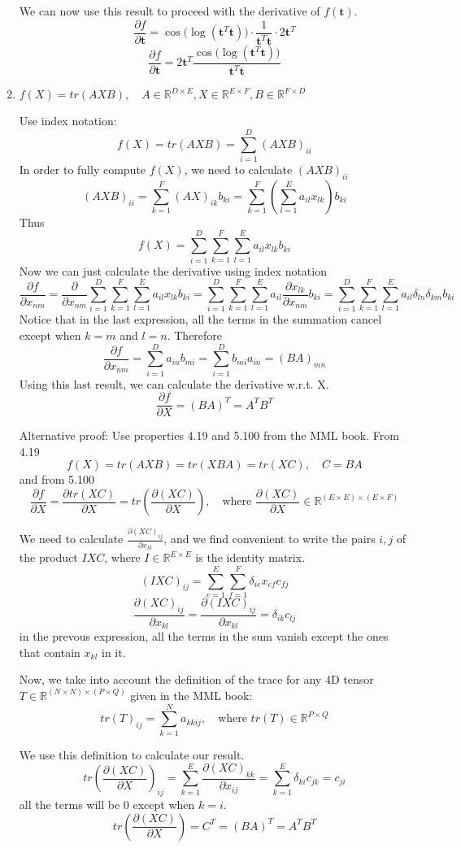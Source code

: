 \begin{enumerate}[label=\alph*]
We can now use this result to proceed with the derivative of $f(\textbf{t})$.
\[
\frac{\partial f}{\partial \textbf{t}} = \cos \big(\log(\textbf{t}^T\textbf{t})\big) \cdot \frac{1}{\textbf{t}^T\textbf{t}} \cdot 2\textbf{t}^T
\]
\[
\frac{\partial f}{\partial \textbf{t}} = 2\textbf{t}^T \frac{\cos\big(\log(\textbf{t}^T\textbf{t})\big)}{\textbf{t}^T\textbf{t}}
\]

\item $f(X) = tr(AXB), \quad A\in \mathbb{R}^{D\times E},
X\in \mathbb{R}^{E\times F},
B\in \mathbb{R}^{F\times D}$

Use index notation:
\[
f(X) = tr(AXB) = \sum_{i=1}^D (AXB)_{ii}
\]
In order to fully compute $f(X)$, we need to calculate $(AXB)_{ii}$
\[
(AXB)_{ii} = \sum_{k=1}^F (AX)_{ik}b_{ki} = \sum_{k=1}^F \left(\sum_{l=1}^E a_{il}x_{lk}\right)b_{ki}
\]
Thus
\[
f(X) = \sum_{i=1}^D\sum_{k=1}^F \sum_{l=1}^E a_{il}x_{lk}b_{ki}
\]
Now we can just calculate the derivative using index notation
\[
\frac{\partial f}{\partial x_{nm}} = \frac{\partial}{\partial x_{nm}} \sum_{i=1}^D\sum_{k=1}^F \sum_{l=1}^E a_{il}x_{lk}b_{ki} = \sum_{i=1}^D\sum_{k=1}^F \sum_{l=1}^E a_{il}\frac{\partial x_{lk}}{\partial x_{nm}}b_{ki} = \sum_{i=1}^D\sum_{k=1}^F \sum_{l=1}^E a_{il}\delta_{ln}\delta_{km}b_{ki}
\]
Notice that in the last expression, all the terms in the summation cancel except when $k=m$ and $l=n$. Therefore
\[
\frac{\partial f}{\partial x_{nm}} = \sum_{i=1}^D a_{in}b_{mi} = \sum_{i=1}^D b_{mi}a_{in} = (BA)_{mn}
\]
Using this last result, we can calculate the derivative w.r.t. X.
\[
\frac{\partial f}{\partial X} = (BA)^T = A^TB^T
\]

Alternative proof: Use properties 4.19 and 5.100 from the MML book.
From 4.19
\[
f(X) = tr(AXB) = tr(XBA) = tr(XC), \quad C = BA
\]
and from 5.100
\[
\frac{\partial f}{\partial X} = \frac{\partial tr(XC)}{\partial X} = tr\left(\frac{\partial (XC)}{\partial X}\right), \quad \text{where } \frac{\partial (XC)}{\partial X}\in \mathbb{R}^{(E \times E) \times (E \times F)}
\]

We need to calculate $\frac{\partial (XC)_{ij}}{\partial x_{kl}}$, and we find convenient to write the pairs $i,j$ of the product $IXC$, where $I \in \mathbb{R}^{E\times E}$ is the identity matrix.
\[
(IXC)_{ij} = \sum_{e=1}^E \sum_{f=1}^F \delta_{ie}x_{ef}c_{fj}
\]
\[
\frac{\partial (XC)_{ij}}{\partial x_{kl}} = \frac{\partial (IXC)_{ij}}{\partial x_{kl}} = \delta_{ik}c_{lj}
\]
in the prevous expression, all the terms in the sum vanish except the ones that contain $x_{kl}$ in it.

Now, we take into account the definition of the trace for any 4D tensor $T\in\mathbb{R}^{(N\times N)\times (P \times Q)}$ given in the MML book:
\[
tr(T)_{ij} = \sum_{k=1}^N a_{kkij}, \quad \text{where } tr(T) \in \mathbb{R}^{P\times Q}
\]

We use this definition to calculate our result.
\[
tr\left(\frac{\partial (XC)}{\partial X}\right)_{ij} = \sum_{k=1}^{E} \frac{\partial (XC)_{kk}}{\partial x_{ij}} = \sum_{k=1}^{E} \delta_{ki} c_{jk} = c_{ji}
\]
all the terms will be 0 except when $k=i$.
\[
tr\left(\frac{\partial (XC)}{\partial X}\right) = C^T = (BA)^T = A^TB^T
\]
\end{enumerate}


